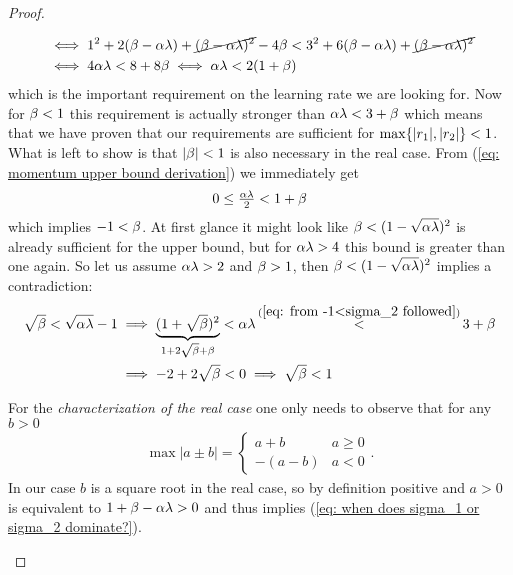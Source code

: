 \begin{proof}
\begin{description}[wide, labelindent=0pt]
\begin{align}
			\nonumber
			&\iff 1^2 + 2(\beta-\alpha\lambda) + \cancel{(\beta-\alpha\lambda)^2} - 4\beta
			< 3^2 + 6(\beta-\alpha\lambda) + \cancel{(\beta-\alpha\lambda)^2}\\
			\label{eq: momentum upper bound derivation}
			&\iff 4\alpha\lambda < 8 + 8\beta
			\iff \alpha\lambda < 2(1+\beta)
		\end{align}
		which is the important requirement on the learning rate we are looking for.
		Now for \(\beta<1\) this requirement is actually stronger than
		\(\alpha\lambda <3+\beta\) which means that we have proven that our
		requirements are sufficient for \(\max\{|r_1|,|r_2|\}<1\).
		What is left to show is that \(|\beta|<1\) is also necessary in the real
		case. From (\ref{eq: momentum upper bound derivation}) we immediately
		get
		\begin{align*}
			0 \le \tfrac{\alpha\lambda}2 < 1+\beta
		\end{align*}
		which implies \(-1 < \beta\). At first glance it might look like
		\(\beta<(1-\sqrt{\alpha\lambda})^2\) is already sufficient for the upper
		bound, but for \(\alpha\lambda>4\) this bound is greater than one again.
		So let us assume \(\alpha\lambda>2\) and \(\beta>1\), then
		\(\beta<(1-\sqrt{\alpha\lambda})^2\) implies a contradiction:
		\begin{align*}
			\sqrt{\momCoeff} < \sqrt{\lrSq\hesseEV} -1
			&\implies \underbrace{(1+\sqrt{\momCoeff})^2}_{1+2\sqrt{\momCoeff} + \momCoeff}
			< \lrSq\hesseEV
			\stackrel{(\ref{eq: from -1<sigma_2 followed})}{<} 3+\momCoeff \\
			&\implies -2 +2\sqrt{\momCoeff} < 0
			\implies \sqrt{\momCoeff} < 1
		\end{align*}

		For the \emph{characterization of the real case} one only needs to observe
		that for any \(b>0\)
		\begin{align}
			\max|a\pm b| = \begin{cases}
				a + b & a \ge 0\\
				-(a-b) & a < 0
			\end{cases}.
		\end{align}
		In our case \(b\) is a square root in the real case, so by definition
		positive and \(a>0\) is equivalent to \(1+\beta - \alpha\lambda >0\)
		and thus implies (\ref{eq: when does sigma_1 or sigma_2 dominate?}).
		

\end{description}
\end{proof}
